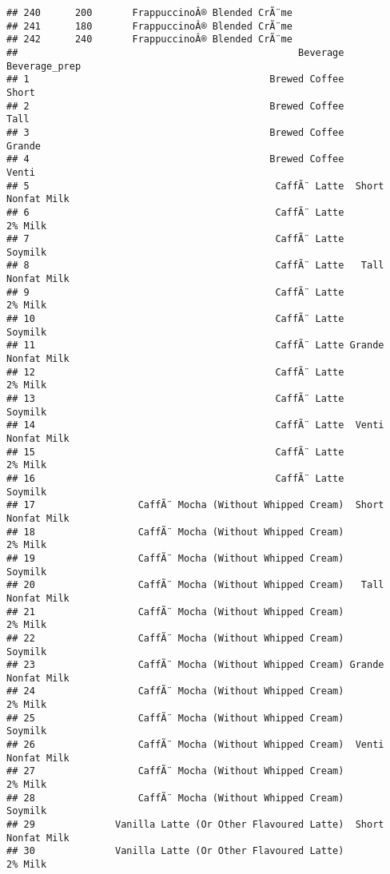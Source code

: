 \documentclass[
]{article}
\begin{document}
\begin{verbatim}
## 240      200       FrappuccinoÂ® Blended CrÃ¨me
## 241      180       FrappuccinoÂ® Blended CrÃ¨me
## 242      240       FrappuccinoÂ® Blended CrÃ¨me
##                                                 Beverage      Beverage_prep
## 1                                          Brewed Coffee              Short
## 2                                          Brewed Coffee               Tall
## 3                                          Brewed Coffee             Grande
## 4                                          Brewed Coffee              Venti
## 5                                           CaffÃ¨ Latte  Short Nonfat Milk
## 6                                           CaffÃ¨ Latte            2% Milk
## 7                                           CaffÃ¨ Latte            Soymilk
## 8                                           CaffÃ¨ Latte   Tall Nonfat Milk
## 9                                           CaffÃ¨ Latte            2% Milk
## 10                                          CaffÃ¨ Latte            Soymilk
## 11                                          CaffÃ¨ Latte Grande Nonfat Milk
## 12                                          CaffÃ¨ Latte            2% Milk
## 13                                          CaffÃ¨ Latte            Soymilk
## 14                                          CaffÃ¨ Latte  Venti Nonfat Milk
## 15                                          CaffÃ¨ Latte            2% Milk
## 16                                          CaffÃ¨ Latte            Soymilk
## 17                  CaffÃ¨ Mocha (Without Whipped Cream)  Short Nonfat Milk
## 18                  CaffÃ¨ Mocha (Without Whipped Cream)            2% Milk
## 19                  CaffÃ¨ Mocha (Without Whipped Cream)            Soymilk
## 20                  CaffÃ¨ Mocha (Without Whipped Cream)   Tall Nonfat Milk
## 21                  CaffÃ¨ Mocha (Without Whipped Cream)            2% Milk
## 22                  CaffÃ¨ Mocha (Without Whipped Cream)            Soymilk
## 23                  CaffÃ¨ Mocha (Without Whipped Cream) Grande Nonfat Milk
## 24                  CaffÃ¨ Mocha (Without Whipped Cream)            2% Milk
## 25                  CaffÃ¨ Mocha (Without Whipped Cream)            Soymilk
## 26                  CaffÃ¨ Mocha (Without Whipped Cream)  Venti Nonfat Milk
## 27                  CaffÃ¨ Mocha (Without Whipped Cream)            2% Milk
## 28                  CaffÃ¨ Mocha (Without Whipped Cream)            Soymilk
## 29              Vanilla Latte (Or Other Flavoured Latte)  Short Nonfat Milk
## 30              Vanilla Latte (Or Other Flavoured Latte)            2% Milk

\end{verbatim}
\end{document}
